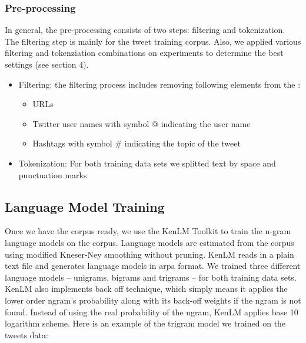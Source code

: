 \documentclass[11pt,a4paper]{article}
\begin{document}
\subsubsection{Pre-processing}
In general, the pre-processing consists of two steps: filtering and tokenization. The filtering step is mainly for the tweet training corpus. Also, we applied various filtering and tokenziation combinations on experiments to determine the best settings (see section 4). 
\begin{itemize}
\item Filtering: the filtering process includes removing following elements from the :
\begin{itemize}
\item URLs
\item Twitter user names with symbol @ indicating the user name
\item Hashtags with symbol \# indicating the topic of the tweet
\end{itemize}
\item Tokenization: For both training data sets we splitted text by space and punctuation marks
\end{itemize}
\subsection{Language Model Training}
Once we have the corpus ready, we use the KenLM Toolkit to train the n-gram language models on the corpus. Language models are estimated from the corpus using modified Kneser-Ney smoothing without pruning. KenLM reads in a plain text file and generates language models in arpa format. We trained three different language models -- unigrams, bigrams and trigrams -- for both training data sets. KenLM also implements back off technique, which simply means it applies the lower order ngram's probability along with its back-off weights if the ngram is not found. Instead of using the real probability of the ngram, KenLM applies base 10 logarithm scheme. Here is an example of the trigram model we trained on the tweets data:
\end{document}

